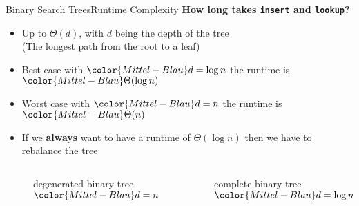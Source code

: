 
\begin{frame}{Binary Search Trees}{Runtime Complexity}
  \textbf{How long takes \texttt{\color{Mittel-Blau}insert} and
    \texttt{\color{Mittel-Blau}lookup}?}
  \begin{itemize}
    \item<2->
      Up to $\Theta(d)$, with $d$ being the
      {\color{Mittel-Blau}depth of the tree}\\
      (The longest path from the root to a leaf)
    \item<3->
      {\color{Mittel-Blau}Best case} with ${\color{Mittel-Blau}d = \log n}$
      the runtime is ${\color{Mittel-Blau}\Theta(\log n)}$
    \item<4->
      {\color{Mittel-Blau}Worst case} with ${\color{Mittel-Blau}d = n}$
      the runtime is ${\color{Mittel-Blau}\Theta(n)}$
    \item<5->
      If we \textbf{always} want to have a runtime of $\Theta(\log n)$ then
      we have to {\color{Mittel-Blau}rebalance} the tree
  \end{itemize}
  \vspace{-2.0em}
  \begin{columns}%
    \begin{column}[b]{0.4\textwidth}%
      \begin{figure}%
        \caption{degenerated binary tree ${\color{Mittel-Blau}d = n}$}%
      \end{figure}%
    \end{column}%
    \begin{column}[b]{0.6\textwidth}%
      \begin{figure}%
        \caption{complete binary tree ${\color{Mittel-Blau}d = \log n}$}%
        \vspace{0.85em}%
      \end{figure}%
    \end{column}%
  \end{columns}%
\end{frame}
